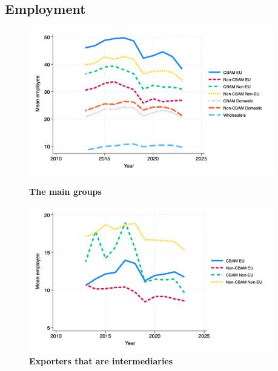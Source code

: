 \documentclass{article}
\begin{document}
\subsection{Employment}
\begin{figure}[H]
\centering
\includegraphics[width=0.95\textwidth]{employee_main_groups.png}
\caption{\textbf{The main groups}}
\includegraphics[width=0.95\textwidth]{employee_ei.png}
\caption{\textbf{Exporters that are intermediaries}}
\end{figure}
\end{document}
